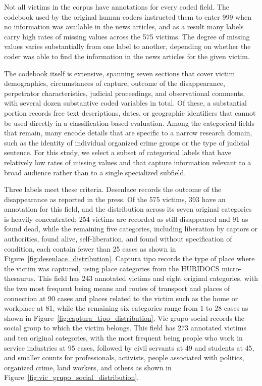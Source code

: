 \documentclass{article}
\begin{document}
Not all victims in the corpus have annotations for every coded field. The codebook used by the original human coders instructed them to enter 999 when no information was available in the news articles, and as a result many labels carry high rates of missing values across the 575 victims. The degree of missing values varies substantially from one label to another, depending on whether the coder was able to find the information in the news articles for the given victim.

The codebook itself is extensive, spanning seven sections that cover victim demographics, circumstances of capture, outcome of the disappearance, perpetrator characteristics, judicial proceedings, and observational comments, with several dozen substantive coded variables in total. Of these, a substantial portion records free text descriptions, dates, or geographic identifiers that cannot be used directly in a classification-based evaluation. Among the categorical fields that remain, many encode details that are specific to a narrow research domain, such as the identity of individual organized crime groups or the type of judicial sentence. For this study, we select a subset of categorical labels that have relatively low rates of missing values and that capture information relevant to a broad audience rather than to a single specialized subfield.

Three labels meet these criteria. Desenlace records the outcome of the disappearance as reported in the press. Of the 575 victims, 393 have an annotation for this field, and the distribution across its seven original categories is heavily concentrated: 254 victims are recorded as still disappeared and 91 as found dead, while the remaining five categories, including liberation by captors or authorities, found alive, self-liberation, and found without specification of condition, each contain fewer than 25 cases as shown in Figure~\ref{fig:desenlace_distribution}. Captura tipo records the type of place where the victim was captured, using place categories from the HURIDOCS micro-thesaurus. This field has 243 annotated victims and eight original categories, with the two most frequent being means and routes of transport and places of connection at 90 cases and places related to the victim such as the home or workplace at 81, while the remaining six categories range from 1 to 28 cases as shown in Figure~\ref{fig:captura_tipo_distribution}. Vic grupo social records the social group to which the victim belongs. This field has 273 annotated victims and ten original categories, with the most frequent being people who work in service industries at 95 cases, followed by civil servants at 49 and students at 45, and smaller counts for professionals, activists, people associated with politics, organized crime, land workers, and others as shown in Figure~\ref{fig:vic_grupo_social_distribution}.
\end{document}

